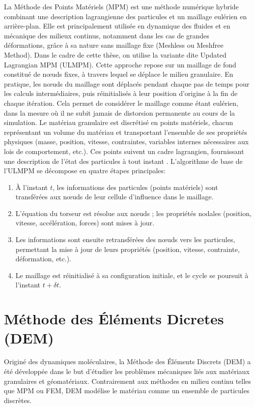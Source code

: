 \documentclass[a4paper,12pt]{report}
\begin{document}
La Méthode des Points Matériels (MPM) est une méthode numérique hybride combinant une description lagrangienne des particules et un maillage eulérien en arrière-plan. Elle est principalement utilisée en dynamique des fluides et en mécanique des milieux continus, notamment dans les cas de grandes déformations, grâce à sa nature sans maillage fixe (Meshless ou Meshfree Method)\citep{duverger2023multi}.
Dans le cadre de cette thèse, on utilise la variante dite Updated Lagrangian MPM (ULMPM). Cette approche repose sur un maillage de fond constitué de n\oe uds fixes, à travers lequel se déplace le milieu granulaire. En pratique, les n\oe uds du maillage sont déplacés pendant chaque pas de temps pour les calculs intermédiaires, puis réinitialisés à leur position d’origine à la fin de chaque itération. Cela permet de considérer le maillage comme étant eulérien, dans la mesure où il ne subit jamais de distorsion permanente au cours de la simulation.
Le matériau granulaire est discrétisé en points matériels, chacun représentant un volume du matériau et transportant l’ensemble de ses propriétés physiques (masse, position, vitesse, contraintes, variables internes nécessaires aux lois de comportement, etc.). Ces points suivent un cadre lagrangien, fournissant une description de l’état des particules à tout instant \citep{danies2018application}.
L’algorithme de base de l’ULMPM se décompose en quatre étapes principales:

\begin{enumerate}
  \item À l’instant $t$, les informations des particules (points matériels) sont transférées aux n\oe uds de leur cellule d’influence dans le maillage.
  \item L’équation du torseur est résolue aux n\oe uds ; les propriétés nodales (position, vitesse, accélération, forces) sont mises à jour.
  \item Les informations sont ensuite retransférées des n\oe uds vers les particules, permettant la mise à jour de leurs propriétés (position, vitesse, contrainte, déformation, etc.).
  \item Le maillage est réinitialisé à sa configuration initiale, et le cycle se poursuit à l’instant $t + \delta t$.
\end{enumerate}


\section{Méthode des Éléments Dicretes (DEM)}
Originé des dynamiques moléculaires, la Méthode des Éléments Discrets (DEM) a été développée dans le but d'étudier les problèmes mécaniques liés aux matériaux granulaires et géomatériaux. Contrairement aux méthodes en milieu continu telles que MPM ou FEM, DEM modélise le matériau comme un ensemble de particules discrètes.
\end{document}
